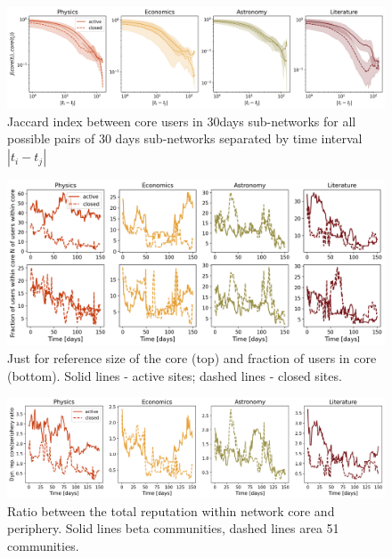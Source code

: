 \begin{figure}[h!]
	\centering
	\includegraphics[width=\linewidth]{Figures/FigA9.png}
	\caption{Jaccard index between core users in 30days sub-networks for all possible pairs of 30 days sub-networks separated by time interval $|t_i - t_j|$}
	\label{fig:jaccard_mean}
\end{figure}


\begin{figure}[h!]
	\centering
	\includegraphics[width=\linewidth]{Figures/FigA11.png}
	\caption{Just for reference size of the core (top) and fraction of users in core (bottom). Solid lines - active sites; dashed lines - closed sites.}
	\label{fig:core_size}
\end{figure}

\begin{figure}[h!]
	\centering
	\includegraphics[width=\linewidth]{Figures/FigA12.png}
	\caption{Ratio between the total reputation within network core and periphery. Solid lines beta communities, dashed lines area 51 communities.}
	\label{fig:dr_core_per}
\end{figure}

